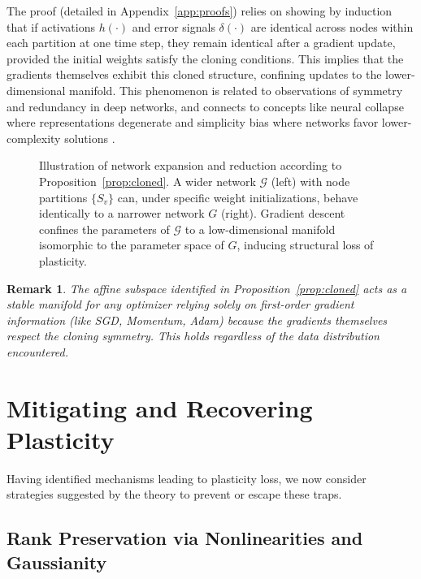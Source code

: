 \documentclass{article}
\newtheorem{remark}{Remark}[section]
\begin{document}
The proof (detailed in Appendix~\ref{app:proofs}) relies on showing by induction that if activations $h(\cdot)$ and error signals $\delta(\cdot)$ are identical across nodes within each partition at one time step, they remain identical after a gradient update, provided the initial weights satisfy the cloning conditions. This implies that the gradients themselves exhibit this cloned structure, confining updates to the lower-dimensional manifold. This phenomenon is related to observations of symmetry and redundancy in deep networks, and connects to concepts like neural collapse where representations degenerate \cite{papyan2020prevalence} and simplicity bias where networks favor lower-complexity solutions \cite{huh2022lowrank}.

\begin{figure}[t]
    \centering
    \resizebox{\textwidth}{!}{}
    \caption{Illustration of network expansion and reduction according to Proposition~\ref{prop:cloned}. A wider network $\mathcal{G}$ (left) with node partitions $\{S_v\}$ can, under specific weight initializations, behave identically to a narrower network $G$ (right). Gradient descent confines the parameters of $\mathcal{G}$ to a low-dimensional manifold isomorphic to the parameter space of $G$, inducing structural loss of plasticity.}
    \label{fig:plasticity-manifolds}
\end{figure}

\begin{remark}
The affine subspace identified in Proposition~\ref{prop:cloned} acts as a stable manifold for any optimizer relying solely on first-order gradient information (like SGD, Momentum, Adam) because the gradients themselves respect the cloning symmetry. This holds regardless of the data distribution encountered.
\end{remark}

\section{Mitigating and Recovering Plasticity}
\label{sec:mitigate}

Having identified mechanisms leading to plasticity loss, we now consider strategies suggested by the theory to prevent or escape these traps.

\subsection{Rank Preservation via Nonlinearities and Gaussianity}
\end{document}
